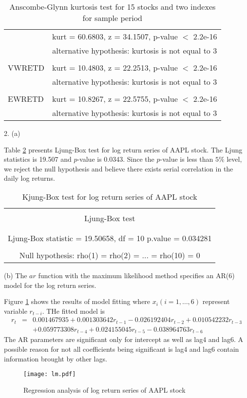 \documentclass[11pt]{article}
\begin{document}
\begin{table}
\begin{tabular}{lc}
&kurt = 60.6803, z = 34.1507, p-value $<$ 2.2e-16\\
&alternative hypothesis: kurtosis is not equal to 3\\
\\
VWRETD

	
&kurt = 10.4803, z = 22.2513, p-value $<$ 2.2e-16\\
&alternative hypothesis: kurtosis is not equal to 3\\
\\
EWRETD

&kurt = 10.8267, z = 22.5755, p-value $<$ 2.2e-16\\
&alternative hypothesis: kurtosis is not equal to 3\\
\end{tabular}
\caption{ Anscombe-Glynn kurtosis test for 15 stocks and two indexes for sample period}\label{tab5}
\end{table}

2. (a)

Table \ref{tab6} presents Ljung-Box test for log return series of AAPL stock. The Ljung statistics is 19.507 and $p$-value is 0.0343. Since the $p$-value is less than $5\%$ level, we reject the null hypothesis and believe there exists serial correlation in the daily log returns.
\begin{table}[ht]
\centering
\begin{tabular}{c}
  \hline
\\
 Ljung-Box test\\
\\
\hline
\\
Ljung-Box statistic = 19.50658, df = 10 p.value = 0.034281\\
\\
Null hypothesis: rho(1) = rho(2) = ... = rho(10) = 0\\
\hline
\end{tabular}
\caption{ Kjung-Box test for log return series of AAPL stock}\label{tab6}
\end{table}

(b)
The $ar$ function with the maximum likelihood method specifies an AR(6) model for the log return series.

Figure \ref{lm} shows the results of model fitting where $x_i (i=1,\ldots,6)$ represent variable $r_{t-i}$. THe fitted model is
\begin{eqnarray*}
r_t&=&0.001467935+  0.001303642r_{t-1} -0.026192404 r_{t-2} +0.010542232 r_{t-3} \\
&& +0.059773308 r_{t-4} +0.024155045r_{t-5} -0.038964763r_{t-6}
\end{eqnarray*}
The AR parameters are significant only for intercept as well as lag4 and lag6. A possible reason for not all coefficients being significant is lag4 and lag6 contain information brought by other lags.
\begin{figure}
\centering
\texttt{[image: lm.pdf]}
\caption{Regression analysis of log return series of AAPL stock  }
\label{lm}
\end{figure}
\end{document}
